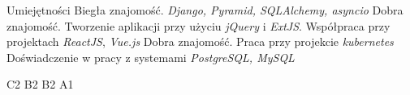 \begin{rubric}{Umiejętności}
\entry*[Python]
	Biegła znajomość.\newline
    \textit{Django, Pyramid, SQLAlchemy, asyncio}
\entry*[JavaScript]
	Dobra znajomość.\newline
    Tworzenie aplikacji przy użyciu \textit{jQuery} i \textit{ExtJS}.
    Współpraca przy projektach \textit{ReactJS}, \textit{Vue.js}
\entry*[Go]
	Dobra  znajomość.\newline
    Praca przy projekcie \textit{kubernetes}
    Doświadczenie w pracy z systemami \textit{PostgreSQL, MySQL}

\entry*[Angielski]
    C2
\entry*[Rosyjski]
	B2
\entry*[Cerkiewnosłowiański]
	B2
\entry*[Gruziński]
    A1
\end{rubric}
